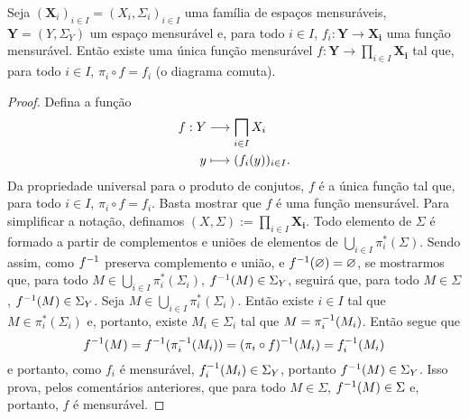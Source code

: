 \begin{prop}
Seja $(\bm X_i)_{i \in I} = (X_i,\Sigma_i)_{i \in I}$ uma família de espaços mensuráveis, $\bm Y = (Y,\Sigma_Y)$ um espaço mensurável e, para todo $i \in I$, $f_i: \bm Y \to \bm{X_i}$ uma função mensurável. Então existe uma única função mensurável $f: \bm Y \to \prod_{i \in I} \bm{X_i}$ tal que, para todo $i \in I$, $\pi_i \circ f = f_i$ (o diagrama comuta).
\begin{figure}
\centering
{}
\end{figure}
\end{prop}
\begin{proof}
Defina a função
	\begin{align*}
	\func{f}{Y}{\prod_{i \in I} X_i}{y}{(f_i(y))_{i \in I}}.
	\end{align*}
Da propriedade universal para o produto de conjutos, $f$ é a única função tal que, para todo $i \in I$, $\pi_i \circ f = f_i$. Basta mostrar que $f$ é uma função mensurável. Para simplificar a notação, definamos $(X,\Sigma) := \prod_{i \in I} \bm{X_i}$. Todo elemento de $\Sigma$ é formado a partir de complementos e uniões de elementos de $\bigcup_{i \in I} \pi_i^*(\Sigma)$. Sendo assim, como $f^{-1}$ preserva complemento e união, e $f^{-1}(\varnothing)=\varnothing$, se mostrarmos que, para todo $M \in \bigcup_{i \in I} \pi_i^*(\Sigma_i)$, $f^{-1}(M) \in \Sigma_Y$, seguirá que, para todo $M \in \Sigma$, $f^{-1}(M) \in \Sigma_Y$. Seja $M \in \bigcup_{i \in I} \pi_i^*(\Sigma_i)$. Então existe $i \in I$ tal que $M \in \pi_i^*(\Sigma_i)$ e, portanto, existe $M_i \in \Sigma_i$ tal que $M=\pi_i^{-1}(M_i)$. Então segue que
	\begin{equation*}
	f^{-1}(M) = f^{-1}(\pi_i^{-1}(M_i)) = (\pi_i \circ f)^{-1}(M_i) = f_i^{-1}(M_i)
	\end{equation*}
e portanto, como $f_i$ é mensurável, $f_i^{-1}(M_i) \in \Sigma_Y$, portanto $f^{-1}(M) \in \Sigma_Y$. Isso prova, pelos comentários anteriores, que para todo $M \in \Sigma$, $f^{-1}(M) \in \Sigma$ e, portanto, $f$ é mensurável.
\end{proof}








